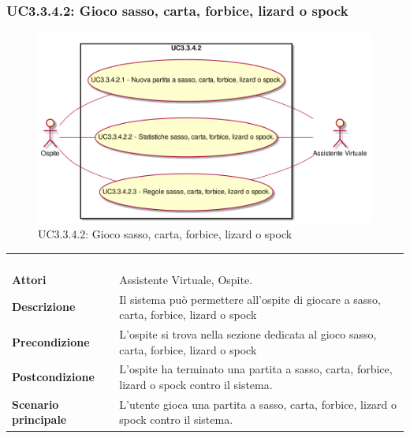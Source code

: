 \newpage\subsubsection{UC3.3.4.2: Gioco sasso, carta, forbice, lizard o spock}
\label{UC3.3.4.2}
\begin{figure}[h]
\centering
\includegraphics[width=\textwidth,height=\textheight,keepaspectratio]{images/UseCaseUC3342.png}
\caption{UC3.3.4.2: Gioco sasso, carta, forbice, lizard o spock}
\end{figure}
\begin{longtable}{l|p{10cm}}
\rowcolor[gray]{0.8} \multicolumn{2}{c}{} \\
\rowcolor[gray]{0.8} \multicolumn{2}{c}{\textbf{UC3.3.4.2 - Gioco sasso, carta, forbice, lizard o spock}} \\
\rowcolor[gray]{0.8} \multicolumn{2}{c}{} \\
\hline
&\\
\textbf{Attori} & Assistente Virtuale, Ospite.\\[7pt]
\textbf{Descrizione} & Il sistema può permettere all'ospite di giocare a  sasso, carta, forbice, lizard o spock\\[7pt]
\textbf{Precondizione} & L'ospite si trova nella sezione dedicata al gioco sasso, carta, forbice, lizard o spock\\[7pt]
\textbf{Postcondizione} & L'ospite ha terminato una partita a sasso, carta, forbice, lizard o spock contro il sistema.\\[7pt]
\textbf{Scenario principale} &L'utente gioca una partita a sasso, carta, forbice, lizard o spock contro il sistema.\\[7pt]\hline
\end{longtable}

